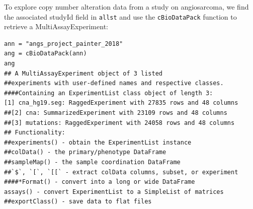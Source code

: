 
To explore copy number alteration data from a study on angiosarcoma,
we find the associated studyId field in \texttt{allst} and use the \texttt{cBioDataPack} function
to retrieve a MultiAssayExperiment:

\begin{shaded}
\begin{verbatim}
ann = "angs_project_painter_2018"
ang = cBioDataPack(ann)
ang
## A MultiAssayExperiment object of 3 listed
##experiments with user-defined names and respective classes.
####Containing an ExperimentList class object of length 3:
[1] cna_hg19.seg: RaggedExperiment with 27835 rows and 48 columns
##[2] cna: SummarizedExperiment with 23109 rows and 48 columns
##[3] mutations: RaggedExperiment with 24058 rows and 48 columns
## Functionality:
##experiments() - obtain the ExperimentList instance
##colData() - the primary/phenotype DataFrame
##sampleMap() - the sample coordination DataFrame
##`$`, `[`, `[[` - extract colData columns, subset, or experiment
####*Format() - convert into a long or wide DataFrame
assays() - convert ExperimentList to a SimpleList of matrices
##exportClass() - save data to flat files
\end{verbatim}
\end{shaded}

